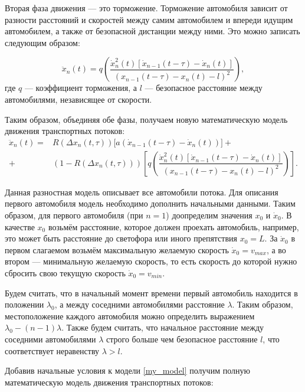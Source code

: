 \documentclass[12pt, a4paper]{extarticle}
\numberwithin{equation}{section}
\numberwithin{figure}{section}
\begin{document}
Вторая фаза движения --- это торможение. Торможение автомобиля зависит от разности расстояний и скоростей между самим автомобилем и впереди идущим автомобилем, а также от безопасной дистанции между ними. Это можно записать следующим образом: 

\begin{equation*}
\ddot{x}_n(t)= q\left(  \dfrac{\dot{x}_n^2(t)\left[  \dot{x}_{n-1}(t-\tau) - \dot{x}_n(t) \right]}{(x_{n-1}(t-\tau)-x_n(t)-l)^2}\right),
\end{equation*}
где $q$ --- коэффициент торможения, а $l$ --- безопасное расстояние между автомобилями, независящее от скорости.

Таким образом, объединяя обе фазы, получаем новую математическую модель движения транспортных потоков:
\begin{equation} \label{my_model} 
\begin{split}
\ddot{x}_n(t)= &R(\Delta x_n(t,\tau))\bigg[ a(\dot{x}_{n-1}(t-\tau)-\dot{x}_n(t))\bigg]  +\\+& (1-R(\Delta x_n(t,\tau)))\left[  q\left(  \dfrac{\dot{x}_n^2(t)\left[  \dot{x}_{n-1}(t-\tau) - \dot{x}_n(t) \right]}{(x_{n-1}(t-\tau)-x_n(t)-l)^2}\right) \right]. 
\end{split}
\end{equation}

Данная разностная модель описывает все автомобили потока. Для описания первого автомобиля модель необходимо дополнить начальными данными. Таким образом, для первого автомобиля (при $n=1$) доопределим значения $x_{0}$ и $\dot{x}_{0}$. В качестве $x_{0}$ возьмём расстояние, которое должен проехать автомобиль, например, это может быть расстояние до светофора или иного препятствия $x_{0}=L$. За $\dot{x}_{0}$ в первом слагаемом возьмём максимальную желаемую скорость $\dot{x}_{0}=v_{max}$, а во втором --- минимальную желаемую скорость, то есть скорость до которой нужно сбросить свою текущую скорость $\dot{x}_{0}=v_{min}$.

Будем считать, что в начальный момент времени первый автомобиль находится в положении $\lambda_0$, а между соседними автомобилями расстояние $\lambda$. Таким образом, местоположение каждого автомобиля можно определить выражением $\lambda_0-(n-1)\lambda$. Также будем считать, что начальное расстояние между соседними автомобилями $\lambda$ строго больше чем безопасное расстояние $l$, что соответствует неравенству $\lambda > l$.

Добавив начальные условия к модели \eqref{my_model} получим полную математическую модель движения транспортных потоков:
\end{document}
